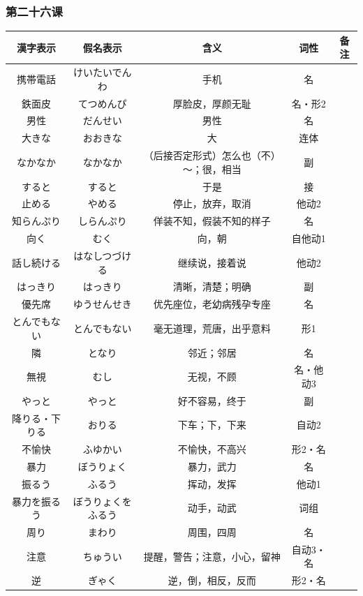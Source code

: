 \subsubsection{第二十六课}
\begin{longtable}{|c|c|c|c|c|}
    \hline
漢字表示 & 假名表示  & 含义 & 词性 & 备注 \\ \hline\hline
携帯電話 & けいたいでんわ & 手机 & 名 &  \\ \hline
鉄面皮 & てつめんぴ & 厚脸皮，厚颜无耻 & 名・形2 &  \\ \hline
男性 & だんせい & 男性 & 名 &  \\ \hline
大きな & おおきな & 大 & 连体 &  \\ \hline
なかなか & なかなか & （后接否定形式）怎么也（不）～；很，相当 & 副 &  \\ \hline
すると & すると & 于是 & 接 &  \\ \hline
止める & やめる & 停止，放弃，取消 & 他动2 &  \\ \hline
知らんぷり & しらんぷり & 佯装不知，假装不知的样子 & 名 &  \\ \hline
向く & むく & 向，朝 & 自他动1 &  \\ \hline
話し続ける & はなしつづける & 继续说，接着说 & 他动2 &  \\ \hline
はっきり & はっきり & 清晰，清楚；明确 & 副 &  \\ \hline
優先席 & ゆうせんせき & 优先座位，老幼病残孕专座 & 名 &  \\ \hline
とんでもない & とんでもない & 毫无道理，荒唐，出乎意料 & 形1 &  \\ \hline
隣 & となり & 邻近；邻居 & 名 &  \\ \hline
無視 & むし & 无视，不顾 & 名・他动3 &  \\ \hline
やっと & やっと & 好不容易，终于 & 副 &  \\ \hline
降りる・下りる & おりる & 下车；下，下来 & 自动2 &  \\ \hline
不愉快 & ふゆかい & 不愉快，不高兴 & 形2・名 &  \\ \hline
暴力 & ぼうりょく & 暴力，武力 & 名 &  \\ \hline
振るう & ふるう & 挥动，发挥 & 他动1 &  \\ \hline
暴力を振るう & ぼうりょくをふるう & 动手，动武 & 词组 &  \\ \hline
周り & まわり & 周围，四周 & 名 &  \\ \hline
注意 & ちゅうい & 提醒，警告；注意，小心，留神 & 自动3・名 &  \\ \hline
逆 & ぎゃく & 逆，倒，相反，反而 & 形2・名 &  \\ \hline

\end{longtable}
